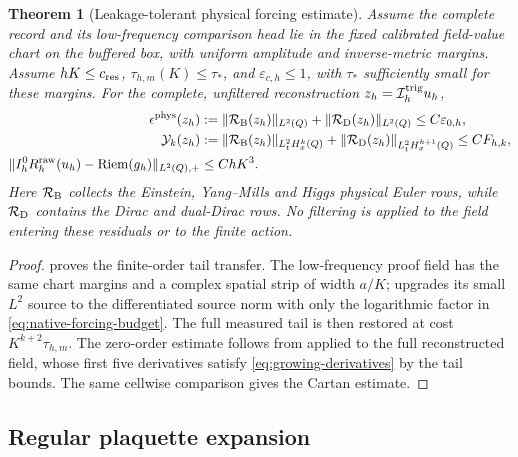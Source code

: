 \documentclass[11pt]{article}
\numberwithin{equation}{section}
\newtheorem{theorem}{Theorem}[section]
\theoremstyle{definition}
\theoremstyle{remark}
\newcommand{\Riem}{\operatorname{Riem}}
\newcommand{\norm}[1]{\lVert#1\rVert}
\begin{document}
\begin{theorem}[Leakage-tolerant physical forcing estimate]
\label{thm:native-source}
Assume the complete record and its low-frequency comparison head lie in the fixed calibrated field-value chart on the buffered box, with uniform amplitude and inverse-metric margins.  Assume $hK\le c_{\rm res}$, $\tau_{h,m}(K)\le\tau_*$, and $\varepsilon_{c,h}\le1$, with $\tau_*$ sufficiently small for these margins.  For the complete, unfiltered reconstruction $z_h=\mathcal I_h^{\rm trig}u_h$,
\begin{align}
 \epsilon^{\rm phys}(z_h)
 &:={\norm{\mathcal R_{\rm B}(z_h)}_{L^2(Q)}}
   +{\norm{\mathcal R_{\rm D}(z_h)}_{L^2(Q)}}
 \le C\varepsilon_{0,h},\label{eq:native-zero-source}\\
 \mathcal Y_k(z_h)
 &:={\norm{\mathcal R_{\rm B}(z_h)}_{L^2_tH_x^k(Q)}}
   +{\norm{\mathcal R_{\rm D}(z_h)}_{L^2_tH_x^{k+1}(Q)}}
 \le C F_{h,k},\label{eq:native-strong-source}\\
 \norm{I_h^0R_h^{\rm raw}(u_h)-\Riem(g_h)}_{L^2(Q),+}
 &\le ChK^3.\label{eq:native-full-Cartan}
\end{align}
Here $\mathcal R_{\rm B}$ collects the Einstein, Yang--Mills and Higgs physical Euler rows, while $\mathcal R_{\rm D}$ contains the Dirac and dual-Dirac rows.  No filtering is applied to the field entering these residuals or to the finite action.
\end{theorem}
\begin{proof}
 proves the finite-order tail transfer.  The low-frequency proof field has the same chart margins and a complex spatial strip of width $a/K$;  upgrades its small $L^2$ source to the differentiated source norm with only the logarithmic factor in \eqref{eq:native-forcing-budget}.  The full measured tail is then restored at cost $K^{k+2}\tau_{h,m}$.  The zero-order estimate follows from  applied to the full reconstructed field, whose first five derivatives satisfy \eqref{eq:growing-derivatives} by the tail bounds.  The same cellwise comparison gives the Cartan estimate.
\end{proof}

\subsection{Regular plaquette expansion}
\end{document}
